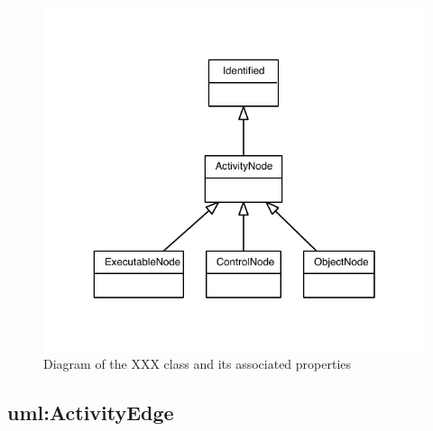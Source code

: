 \begin{figure}[ht]
\begin{center}
\includegraphics[scale=0.6]{uml_classes/ActivityNode_abstraction_hierarchy.pdf}
\caption[]{Diagram of the XXX class and its associated properties}
\label{uml:ActivityNode}
\end{center}
\end{figure}


\subsection{uml:ActivityEdge}
\label{sec:uml:ActivityEdge}

